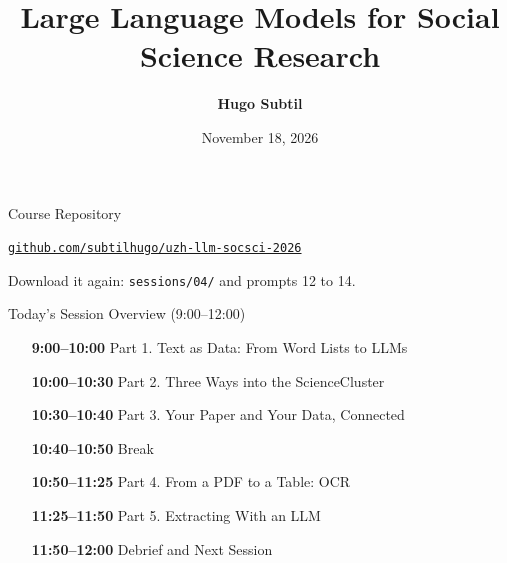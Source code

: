 \documentclass[svgnames,x11names,dvipsnames]{beamer}
\title[LLMs for Social Science Research]{\large \textbf{Large Language Models for Social Science Research} \\[0.2cm]
    \new{\textit{Session 4. From Texts to Variables}}}
\author[H. Subtil]{\textbf{Hugo Subtil}}
\institute{PhD Workshop, University of Zurich}
\date{November 18, 2026}
\newcommand{\chg}[1]{{\bfseries #1}}
\renewcommand{\chg}[1]{#1}
\begin{document}
\frame{\titlepage}

\begin{frame}{Course Repository}
\centering
\vspace{0.2cm}

\vspace{0.5cm}
{\large \href{https://github.com/subtilhugo/uzh-llm-socsci-2026}{\texttt{github.com/subtilhugo/uzh-llm-socsci-2026}}}

\vspace{0.4cm}
{\small Download it again: \texttt{sessions/04/} and prompts 12 to 14.}
\end{frame}

\begin{frame}{\chg{Today's Session Overview (9:00--12:00)}}

\setlength{\leftmargini}{2.3cm}
\small
\begin{enumerate}
    \setlength{\itemsep}{6pt}
    \item[\textbf{9:00--10:00}] Part 1. Text as Data: From Word Lists to LLMs

    \item[\textbf{10:00--10:30}] Part 2. Three Ways into the ScienceCluster

    \item[\textbf{10:30--10:40}] Part 3. Your Paper and Your Data, Connected

    \item[\textbf{10:40--10:50}] Break

    \item[\textbf{10:50--11:25}] Part 4. From a PDF to a Table: OCR

    \item[\textbf{11:25--11:50}] Part 5. Extracting With an LLM

    \item[\textbf{11:50--12:00}] Debrief and Next Session
\end{enumerate}
\end{frame}
\end{document}
